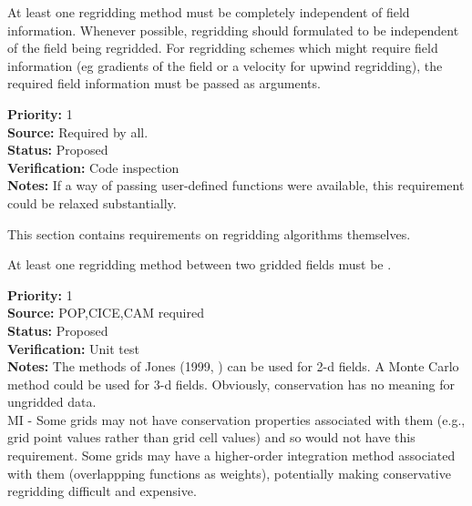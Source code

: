 
At least one regridding method must be completely independent of
field information.  Whenever possible, regridding should formulated to be 
independent of the field being regridded.  For regridding schemes which might 
require field information (eg gradients of the field or a velocity for 
upwind regridding), the required field information must be passed as arguments.

\begin{reqlist}
{\bf Priority:} 1 \\
{\bf Source:} Required by all. \\
{\bf Status:} Proposed \\
{\bf Verification:} Code inspection  \\
{\bf Notes:} If a way of passing user-defined functions
             were available, this requirement could be relaxed substantially.
\end{reqlist}


This section contains requirements on regridding algorithms themselves.


At least one regridding method between two gridded fields must be
.

\begin{reqlist}
{\bf Priority:} 1 \\
{\bf Source:} POP,CICE,CAM required \\
{\bf Status:} Proposed \\
{\bf Verification:} Unit test \\
{\bf Notes:} The methods of Jones (1999, \cite{Jones1999}) can be used
             for 2-d fields. A Monte Carlo method could be used for
             3-d fields.  Obviously, conservation has no meaning
             for ungridded data.
             \\
             MI - Some grids may not have conservation properties
             associated with them (e.g., grid point values rather
             than grid cell values) and so would not have this requirement.
             Some grids may have a higher-order integration method
             associated with them (overlappping functions as weights),
             potentially making conservative regridding difficult and expensive.
\end{reqlist}

